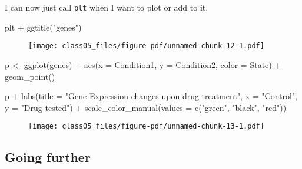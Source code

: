\documentclass[
  letterpaper,
  DIV=11,
  numbers=noendperiod]{scrartcl}
\newenvironment{Shaded}{\begin{snugshade}}{\end{snugshade}}
\newcommand{\AttributeTok}[1]{\textcolor[rgb]{0.40,0.45,0.13}{#1}}
\newcommand{\FunctionTok}[1]{\textcolor[rgb]{0.28,0.35,0.67}{#1}}
\newcommand{\NormalTok}[1]{\textcolor[rgb]{0.00,0.23,0.31}{#1}}
\newcommand{\OtherTok}[1]{\textcolor[rgb]{0.00,0.23,0.31}{#1}}
\newcommand{\SpecialCharTok}[1]{\textcolor[rgb]{0.37,0.37,0.37}{#1}}
\newcommand{\StringTok}[1]{\textcolor[rgb]{0.13,0.47,0.30}{#1}}
\begin{document}
I can now just call \texttt{plt} when I want to plot or add to it.

\begin{Shaded}
\begin{Highlighting}[]
\NormalTok{plt }\SpecialCharTok{+} \FunctionTok{ggtitle}\NormalTok{(}\StringTok{"genes"}\NormalTok{)}
\end{Highlighting}
\end{Shaded}

\begin{figure}[H]

{\centering \texttt{[image: class05\_files/figure-pdf/unnamed-chunk-12-1.pdf]}

}

\end{figure}

\begin{Shaded}
\begin{Highlighting}[]
\NormalTok{p }\OtherTok{\textless{}{-}} \FunctionTok{ggplot}\NormalTok{(genes) }\SpecialCharTok{+}
  \FunctionTok{aes}\NormalTok{(}\AttributeTok{x =}\NormalTok{ Condition1, }\AttributeTok{y =}\NormalTok{ Condition2, }\AttributeTok{color =}\NormalTok{ State) }\SpecialCharTok{+}
  \FunctionTok{geom\_point}\NormalTok{()}

\NormalTok{p }\SpecialCharTok{+} \FunctionTok{labs}\NormalTok{(}\AttributeTok{title =} \StringTok{"Gene Expression changes upon drug treatment"}\NormalTok{, }
         \AttributeTok{x =} \StringTok{"Control"}\NormalTok{, }
         \AttributeTok{y =} \StringTok{"Drug tested"}\NormalTok{) }\SpecialCharTok{+}
  \FunctionTok{scale\_color\_manual}\NormalTok{(}\AttributeTok{values =} \FunctionTok{c}\NormalTok{(}\StringTok{"green"}\NormalTok{, }\StringTok{"black"}\NormalTok{, }\StringTok{"red"}\NormalTok{))}
\end{Highlighting}
\end{Shaded}

\begin{figure}[H]

{\centering \texttt{[image: class05\_files/figure-pdf/unnamed-chunk-13-1.pdf]}

}

\end{figure}

\hypertarget{going-further}{%
\subsection{Going further}\label{going-further}}
\end{document}
